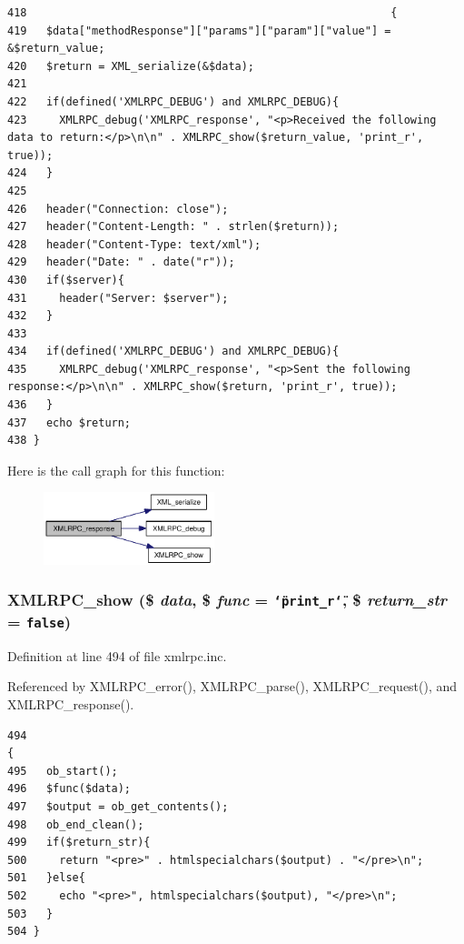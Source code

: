 \begin{Code}\begin{verbatim}418                                                        {
419   $data["methodResponse"]["params"]["param"]["value"] = &$return_value;
420   $return = XML_serialize(&$data);
421 
422   if(defined('XMLRPC_DEBUG') and XMLRPC_DEBUG){
423     XMLRPC_debug('XMLRPC_response', "<p>Received the following data to return:</p>\n\n" . XMLRPC_show($return_value, 'print_r', true));
424   }
425 
426   header("Connection: close");
427   header("Content-Length: " . strlen($return));
428   header("Content-Type: text/xml");
429   header("Date: " . date("r"));
430   if($server){
431     header("Server: $server");
432   }
433 
434   if(defined('XMLRPC_DEBUG') and XMLRPC_DEBUG){
435     XMLRPC_debug('XMLRPC_response', "<p>Sent the following response:</p>\n\n" . XMLRPC_show($return, 'print_r', true));
436   }
437   echo $return;
438 }
\end{verbatim}
\end{Code}




Here is the call graph for this function:\nopagebreak
\begin{figure}[H]
\begin{center}
\leavevmode
\includegraphics[width=141pt]{xmlrpc_8inc_c736d378caaccdd0726ea1080d1f526f_cgraph}
\end{center}
\end{figure}
\hypertarget{xmlrpc_8inc_1f60d2672bcb35f5ff908f64931f8d48}{
\subsubsection{\setlength{\rightskip}{0pt plus 5cm}XMLRPC\_\-show (\$ {\em data}, \$ {\em func} = {\tt \char`\"{}print\_\-r\char`\"{}}, \$ {\em return\_\-str} = {\tt false})}}
\label{xmlrpc_8inc_1f60d2672bcb35f5ff908f64931f8d48}




Definition at line 494 of file xmlrpc.inc.

Referenced by XMLRPC\_\-error(), XMLRPC\_\-parse(), XMLRPC\_\-request(), and XMLRPC\_\-response().

\begin{Code}\begin{verbatim}494                                                                    {
495   ob_start();
496   $func($data);
497   $output = ob_get_contents();
498   ob_end_clean();
499   if($return_str){
500     return "<pre>" . htmlspecialchars($output) . "</pre>\n";
501   }else{
502     echo "<pre>", htmlspecialchars($output), "</pre>\n";
503   }
504 }
\end{verbatim}
\end{Code}



